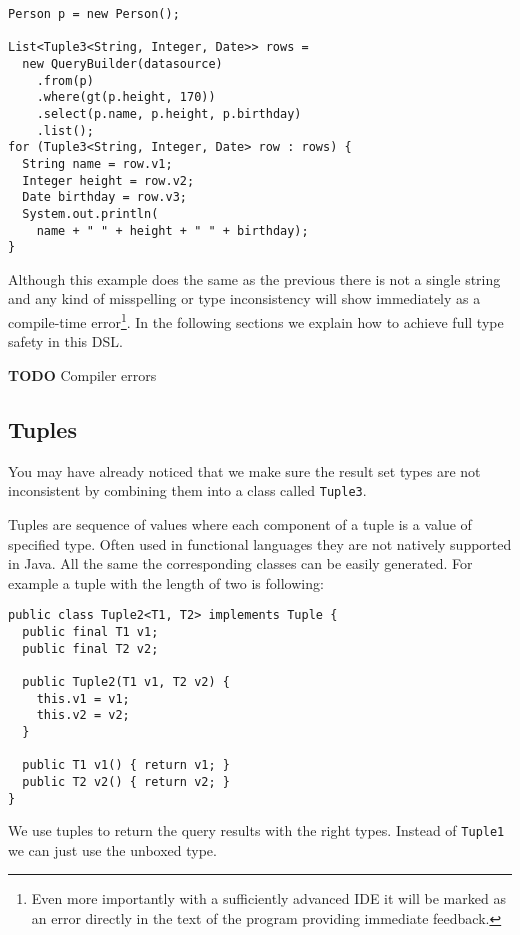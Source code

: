 \documentclass{sig-alternate}
\begin{document}
\begin{verbatim}
Person p = new Person(); 

List<Tuple3<String, Integer, Date>> rows =
  new QueryBuilder(datasource)
    .from(p)
    .where(gt(p.height, 170))
    .select(p.name, p.height, p.birthday)
    .list();
for (Tuple3<String, Integer, Date> row : rows) {
  String name = row.v1;
  Integer height = row.v2;
  Date birthday = row.v3;
  System.out.println(
    name + " " + height + " " + birthday);
}
\end{verbatim}

Although this example does the same as the previous there is not a single string and any kind of misspelling or type inconsistency will show immediately as a compile-time error\footnote{Even more importantly with a sufficiently advanced IDE it will be marked as an error directly in the text of the program providing immediate feedback.}. In the following sections we explain how to achieve full type safety in this DSL.

\textbf{TODO} Compiler errors

\subsection{Tuples}

You may have already noticed that we make sure the result set types are not inconsistent by combining them into a class called \verb!Tuple3!.

Tuples are sequence of values where each component of a tuple is a value of specified type. Often used in functional languages they are not natively supported in Java. All the same the corresponding classes can be easily generated. For example a tuple with the length of two is following:

\begin{verbatim}
public class Tuple2<T1, T2> implements Tuple {
  public final T1 v1;
  public final T2 v2;

  public Tuple2(T1 v1, T2 v2) {
    this.v1 = v1;
    this.v2 = v2;
  }		

  public T1 v1() { return v1; }
  public T2 v2() { return v2; }
}
\end{verbatim}

We use tuples to return the query results with the right types. Instead of \verb!Tuple1! we can just use the unboxed type.
\end{document}
